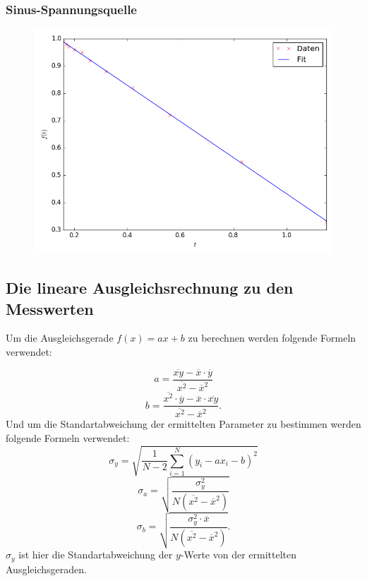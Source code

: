 \newpage
\subsubsection{Sinus-Spannungsquelle}

\begin{figure}[H]
  \centering
  \caption{}
  \includegraphics[width=\linewidth-70pt,height=\textheight-70pt,keepaspectratio]{Sinus.png}
  \label{fig:Sinus}
\end{figure}


\newpage
\subsection{Die lineare Ausgleichsrechnung zu den Messwerten}
Um die Ausgleichsgerade $f(x)=ax+b$ zu berechnen werden folgende Formeln verwendet:

\begin{equation}
a=\frac{ \overline{xy} - \overline{x} \cdot \overline{y}}{\overline{x^2} - \overline{x}^2}
\end{equation}
\begin{equation}
b=\frac{\overline{x^2} \cdot \overline{y} - \overline{x} \cdot \overline{xy}}{\overline{x^2} - \overline{x}^2}\text{.}
\end{equation}
Und um die Standartabweichung der ermittelten Parameter zu bestimmen werden folgende Formeln verwendet:
\begin{equation}
\sigma_y=\sqrt{\frac{1}{N-2}\sum\limits_{i=1}^{N}(y_i - a x_i - b)^2}
\end{equation}
\begin{equation}
\sigma_a=\sqrt{\frac{\sigma_y^2}{N ( \overline{x^2} - \overline{x} ^2 )}}
\end{equation}
\begin{equation}
\sigma_b=\sqrt{\frac{\sigma_y^2 \cdot \overline{x}}{N ( \overline{x^2} - \overline{x} ^2 )}}\text{.}
\end{equation}
$\sigma_y$ ist hier die Standartabweichung der $y$-Werte von der ermittelten Ausgleichsgeraden.


